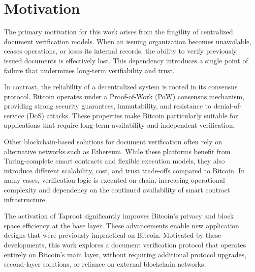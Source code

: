 \section{Motivation}

The primary motivation for this work arises from the fragility of centralized document verification models.
When an issuing organization becomes unavailable, ceases operations, or loses its internal records, the ability to verify previously issued documents is effectively lost.
This dependency introduces a single point of failure that undermines long-term verifiability and trust.

In contrast, the reliability of a decentralized system is rooted in its consensus protocol.
Bitcoin operates under a Proof-of-Work (PoW) consensus mechanism, providing strong security guarantees, immutability, and resistance to denial-of-service (DoS) attacks.
These properties make Bitcoin particularly suitable for applications that require long-term availability and independent verification.

Other blockchain-based solutions for document verification often rely on alternative networks such as Ethereum.
While these platforms benefit from Turing-complete smart contracts and flexible execution models, they also introduce different scalability, cost, and trust trade-offs compared to Bitcoin.
In many cases, verification logic is executed on-chain, increasing operational complexity and dependency on the continued availability of smart contract infrastructure.

The activation of Taproot significantly improves Bitcoin’s privacy and block space efficiency at the base layer.
These advancements enable new application designs that were previously impractical on Bitcoin.
Motivated by these developments, this work explores a document verification protocol that operates entirely on Bitcoin’s main layer, without requiring additional protocol upgrades, second-layer solutions, or reliance on external blockchain networks.
